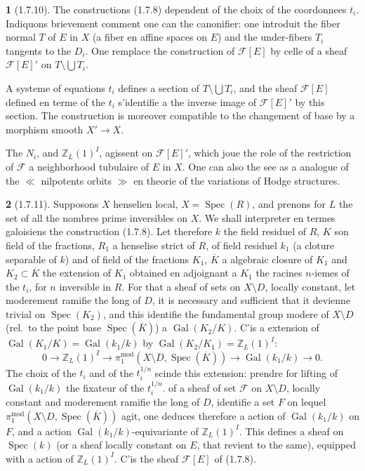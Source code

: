 \documentclass[12pt,a4paper]{article}
\theoremstyle{plain}
\theoremstyle{definition}
\theoremstyle{definition}
\newtheorem{para}{}[section]
\theoremstyle{remark}
\DeclareMathOperator{\Gal}{Gal}
\DeclareMathOperator{\Spec}{Spec}
\begin{document}
\begin{para}[1.7.10]
The constructions (1.7.8) dependent of the choix of the coordonnees $t_i$. Indiquons brievement comment one can the canonifier: one introduit the fiber normal $T$ of $E$ in $X$ (a fiber en affine spaces on $E$) and the under-fibers $T_i$ tangents to the $D_i$. One remplace the construction of $\mathscr{F}[E]$ by celle of a sheaf $\mathscr{F}[E]'$ on $T \setminus \bigcup T_i$.

A systeme of equations $t_i$ defines a section of $T \setminus \bigcup T_i$, and the sheaf $\mathscr{F}[E]$ defined en terme of the $t_i$ s'identifie a the inverse image of $\mathscr{F}[E]'$ by this section. The construction is moreover compatible to the changement of base by a morphism smooth $X' \to X$.

The $N_i$, and $\mathbb{Z}_L(1)^I$, agissent on $\mathscr{F}[E]'$, which joue the role of the restriction of $\mathscr{F}$ a neighborhood tubulaire of $E$ in $X$. One can also the see as a analogue of the $\ll$ nilpotents orbits $\gg$ en theorie of the variations of Hodge structures.
\end{para}

\begin{para}[1.7.11]
Supposons $X$ henselien local, $X = \Spec(R)$, and prenons for $L$ the set of all the nombres prime inversibles on $X$. We shall interpreter en termes galoisiens the construction (1.7.8). Let therefore $k$ the field residuel of $R$, $K$ son field of the fractions, $R_1$ a henselise strict of $R$, of field residuel $k_1$ (a cloture separable of $k$) and of field of the fractions $K_1$, $\overline{K}$ a algebraic closure of $K_1$ and $K_2 \subset \overline{K}$ the extension of $K_1$ obtained en adjoignant a $K_1$ the racines $n$-iemes of the $t_i$, for $n$ inversible in $R$. For that a sheaf of sets on $X \setminus D$, locally constant, let moderement ramifie the long of $D$, it is necessary and sufficient that it devienne trivial on $\Spec(K_2)$, and this identifie the fundamental group modere of $X \setminus D$ (rel.~to the point base $\Spec(\overline{K})$) a $\Gal(K_2/K)$. C'is a extension of $\Gal(K_1/K) = \Gal(k_1/k)$ by $\Gal(K_2/K_1) = \mathbb{Z}_L(1)^I$:
\[0 \to \mathbb{Z}_L(1)^I \to \pi_1^{\text{mod}}(X \setminus D, \Spec(\overline{K})) \to \Gal(k_1/k) \to 0.\]
The choix of the $t_i$ and of the $t_i^{1/n}$ scinde this extension: prendre for lifting of $\Gal(k_1/k)$ the fixateur of the $t_i^{1/n}$. of a sheaf of set $\mathscr{F}$ on $X \setminus D$, locally constant and moderement ramifie the long of $D$, identifie a set $F$ on lequel $\pi_1^{\text{mod}}(X \setminus D, \Spec(\overline{K}))$ agit, one deduces therefore a action of $\Gal(k_1/k)$ on $F$, and a action $\Gal(k_1/k)$-equivariante of $\mathbb{Z}_L(1)^I$. This defines a sheaf on $\Spec(k)$ (or a sheaf locally constant on $E$, that revient to the same), equipped with a action of $\mathbb{Z}_L(1)^I$. C'is the sheaf $\mathscr{F}[E]$ of (1.7.8).
\end{para}
\end{document}
